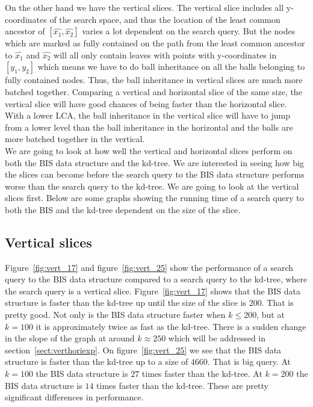 On the other hand we have the vertical slices. The vertical slice includes all y-coordinates of the search space, and thus the location of the least common ancestor of $[\hat{x_1}, \hat{x_2}]$ varies a lot dependent on the search query. But the nodes which are marked as fully contained on the path from the least common ancestor to $\hat{x_1}$ and $\hat{x_2}$ will all only contain leaves with points with y-coordinates in $[y_1, y_2]$ which means we have to do ball inheritance on all the balls belonging to fully contained nodes. Thus, the ball inheritance in vertical slices are much more batched together. Comparing a vertical and horizontal slice of the same size, the vertical slice will have good chances of being faster than the horizontal slice. With a lower LCA, the ball inheritance in the vertical slice will have to jump from a lower level than the ball inheritance in the horizontal and the balls are more batched together in the vertical. \\

We are going to look at how well the vertical and horizontal slices perform on both the BIS data structure and the kd-tree. We are interested in seeing how big the slices can become before the search query to the BIS data structure performs worse than the search query to the kd-tree. We are going to look at the vertical slices first. Below are some graphs showing the running time of a search query to both the BIS and the kd-tree dependent on the size of the slice. 

\subsection{Vertical slices}

Figure~\ref{fig:vert_17} and figure~\ref{fig:vert_25} show the performance of a search query to the BIS data structure compared to a search query to the kd-tree, where the search query is a vertical slice. Figure~\ref{fig:vert_17} shows that the BIS data structure is faster than the kd-tree up until the size of the slice is $200$. That is pretty good. Not only is the BIS data structure faster when $k \leq 200$, but at $k = 100$ it is approximately twice as fast as the kd-tree. There is a sudden change in the slope of the graph at around $k \approx 250$ which will be addressed in section~\ref{sect:verthoriexp}. On figure~\ref{fig:vert_25} we see that the BIS data structure is faster than the kd-tree up to a size of $4660$. That is big query. At $k = 100$ the BIS data structure is $27$ times faster than the kd-tree. At $k = 200$ the BIS data structure is $14$ times faster than the kd-tree. These are pretty significant differences in performance.


